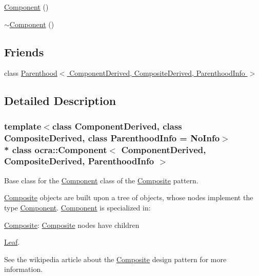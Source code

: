 {\bf }\par
\begin{DoxyCompactItemize}
\item 
\hyperlink{classocra_1_1Component_a4c76a9060703e7f524c73f6b328bb3e1}{Component} ()
\item 
\hyperlink{classocra_1_1Component_a616d0b940599b102fa630107ec169e58}{$\sim$\+Component} ()
\end{DoxyCompactItemize}

\subsection*{Friends}
\begin{DoxyCompactItemize}
\item 
class \hyperlink{classocra_1_1Component_ad71e675afae5fce6263d2d784cd3907a}{Parenthood$<$ Component\+Derived, Composite\+Derived, Parenthood\+Info $>$}
\end{DoxyCompactItemize}


\subsection{Detailed Description}
\subsubsection*{template$<$class Component\+Derived, class Composite\+Derived, class Parenthood\+Info = No\+Info$>$\\*
class ocra\+::\+Component$<$ Component\+Derived, Composite\+Derived, Parenthood\+Info $>$}

Base class for the \hyperlink{classocra_1_1Component}{Component} class of the \hyperlink{classocra_1_1Composite}{Composite} pattern. 

\hyperlink{classocra_1_1Composite}{Composite} objects are built upon a tree of objects, whose nodes implement the type \hyperlink{classocra_1_1Component}{Component}. \hyperlink{classocra_1_1Component}{Component} is specialized in\+:
\begin{DoxyItemize}
\item \hyperlink{classocra_1_1Composite}{Composite}\+: \hyperlink{classocra_1_1Composite}{Composite} nodes have children
\item \hyperlink{classocra_1_1Leaf}{Leaf}.
\end{DoxyItemize}

See the wikipedia article about the \hyperlink{classocra_1_1Composite}{Composite} design pattern for more information.

